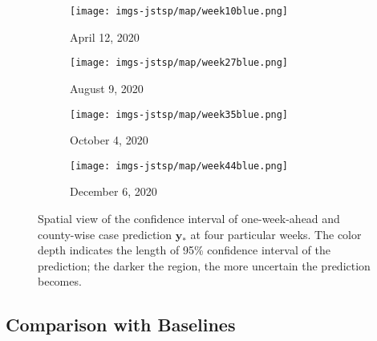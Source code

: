 \documentclass[journal]{IEEEtran}
\begin{document}
\begin{figure*}[!h]
\centering
\begin{subfigure}[h]{0.245\linewidth}
\texttt{[image: imgs-jstsp/map/week10blue.png]}
\caption{April 12, 2020}
\end{subfigure}
\begin{subfigure}[h]{0.245\linewidth}
\texttt{[image: imgs-jstsp/map/week27blue.png]}
\caption{August 9, 2020}
\end{subfigure}
\begin{subfigure}[h]{0.245\linewidth}
\texttt{[image: imgs-jstsp/map/week35blue.png]}
\caption{October 4, 2020}
\end{subfigure}
\begin{subfigure}[h]{0.245\linewidth}
\texttt{[image: imgs-jstsp/map/week44blue.png]}
\caption{December 6, 2020}
\end{subfigure}
\caption{Spatial view of the confidence interval of one-week-ahead and county-wise case prediction $\mathbf{y}_*$ at four particular weeks. The color depth indicates the length of 95\% confidence interval of the prediction; the darker the region, the more uncertain the prediction becomes.}
\label{fig:uncertainty-map}
\end{figure*}




\subsection{Comparison with Baselines}\label{sec:compare_baseline_detect}
\end{document}
